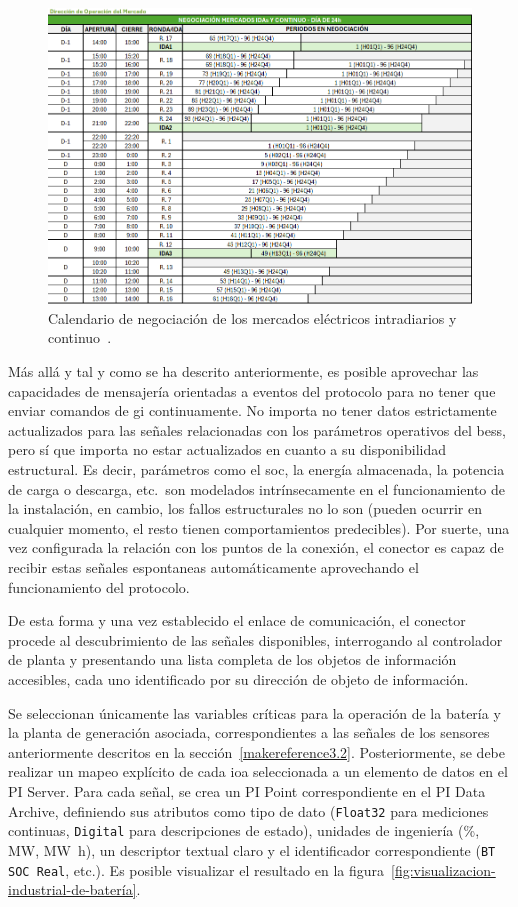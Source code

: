 \begin{figure}
  \centering
  \includegraphics[width=0.75\linewidth]{figures/tiempo-mercados.png}
  \caption{Calendario de negociación de los mercados eléctricos intradiarios y continuo~\cite{omie2025mercado}.}
  \label{fig:tiempo-mercados}
\end{figure}

Más allá y tal y como se ha descrito anteriormente, es posible aprovechar las capacidades de mensajería orientadas a eventos del protocolo para no tener que enviar comandos de \gls{gi} continuamente. No importa no tener datos estrictamente actualizados para las señales relacionadas con los parámetros operativos del \gls{bess}, pero sí que importa no estar actualizados en cuanto a su disponibilidad estructural. Es decir, parámetros como el \gls{soc}, la energía almacenada, la potencia de carga o descarga, etc.\ son modelados intrínsecamente en el funcionamiento de la instalación, en cambio, los fallos estructurales no lo son (pueden ocurrir en cualquier momento, el resto tienen comportamientos predecibles). Por suerte, una vez configurada la relación con los puntos de la conexión, el conector es capaz de recibir estas señales espontaneas automáticamente aprovechando el funcionamiento del protocolo.

De esta forma y una vez establecido el enlace de comunicación, el conector procede al descubrimiento de las señales disponibles, interrogando al controlador de planta y presentando una lista completa de los objetos de información accesibles, cada uno identificado por su dirección de objeto de información.

Se seleccionan únicamente las variables críticas para la operación de la batería y la planta de generación asociada, correspondientes a las señales de los sensores anteriormente descritos en la sección~\ref{makereference3.2}. Posteriormente, se debe realizar un mapeo explícito de cada \gls{ioa} seleccionada a un elemento de datos en el PI Server. Para cada señal, se crea un PI Point correspondiente en el PI Data Archive, definiendo sus atributos como tipo de dato (\texttt{Float32} para mediciones continuas, \texttt{Digital} para descripciones de estado), unidades de ingeniería (\si{\percent}, \si{\mega\watt}, \si{\mega\watt\hour}), un descriptor textual claro y el identificador correspondiente (\texttt{BT SOC Real}, etc.). Es posible visualizar el resultado en la figura~\ref{fig:visualizacion-industrial-de-batería}.

